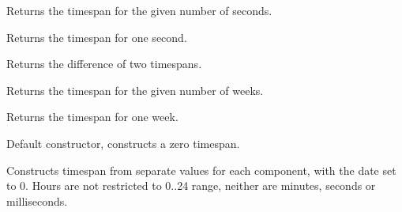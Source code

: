 \label{wxtimespanseconds}


Returns the timespan for the given number of seconds.

\label{wxtimespansecond}


Returns the timespan for one second.

\label{wxtimespansubstract}




Returns the difference of two timespans.

\label{wxtimespanweeks}


Returns the timespan for the given number of weeks.

\label{wxtimespanweek}


Returns the timespan for one week.

\label{wxtimespan}


Default constructor, constructs a zero timespan.


Constructs timespan from separate values for each component, with the date
set to 0. Hours are not restricted to 0..24 range, neither are
minutes, seconds or milliseconds.

